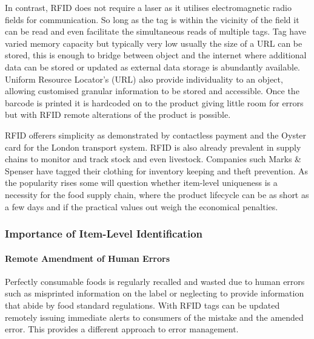 \documentclass[a4paper, 11pt]{article}
\begin{document}
In contrast, RFID does not require a laser as it utilises electromagnetic radio fields for communication. So long as the tag is within the vicinity of the field it can be read and even facilitate the simultaneous reads of multiple tags. Tag have varied memory capacity but typically very low usually the size of a URL can be stored, this is enough to bridge between object and the internet where additional data can be stored or updated as external data storage is abundantly available. Uniform Resource Locator's (URL) also provide individuality to an object, allowing customised granular information to be stored and accessible. Once the barcode is printed it is hardcoded on to the product giving little room for errors but with RFID remote alterations of the product is possible.

RFID offerers simplicity as demonstrated by contactless payment and the Oyster card for the London transport system. RFID is also already prevalent in supply chains to monitor and track stock and even livestock. Companies such Marks \& Spenser have tagged their clothing for inventory keeping and theft prevention. As the popularity rises some will question whether item-level uniqueness is a necessity for the food supply chain, where the product lifecycle can be as short as a few days and if the practical values out weigh the economical penalties. 

\vspace{\baselineskip}
\vspace{\baselineskip}
\vspace{\baselineskip}

\subsubsection{Importance of Item-Level Identification}

\paragraph{Remote Amendment of Human Errors}
Perfectly consumable foods is regularly recalled and wasted due to human errors such as misprinted information on the label or neglecting to provide information that abide by food standard regulations. With RFID tags can be updated remotely issuing immediate alerts to consumers of the mistake and the amended error. This provides a different approach to error management.
\end{document}
